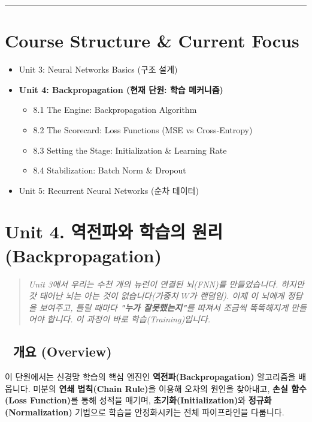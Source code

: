 \documentclass[11pt,a4paper]{book}
\theoremstyle{definition}
\begin{document}

\vspace{1cm}
\hrule
\vspace{1cm}

\section*{Course Structure \& Current Focus}
\begin{itemize}
    \item Unit 3: Neural Networks Basics (구조 설계)
    \item \textbf{\textcolor{mainblue}{Unit 4: Backpropagation (현재 단원: 학습 메커니즘)}}
    \begin{itemize}
        \item 8.1 The Engine: Backpropagation Algorithm
        \item 8.2 The Scorecard: Loss Functions (MSE vs Cross-Entropy)
        \item 8.3 Setting the Stage: Initialization \& Learning Rate
        \item 8.4 Stabilization: Batch Norm \& Dropout
    \end{itemize}
    \item Unit 5: Recurrent Neural Networks (순차 데이터)
\end{itemize}


\section{Unit 4. 역전파와 학습의 원리 (Backpropagation)}

\begin{quote}
\textit{Unit 3에서 우리는 수천 개의 뉴런이 연결된 뇌(FNN)를 만들었습니다. 하지만 갓 태어난 뇌는 아는 것이 없습니다(가중치 $W$가 랜덤임). 이제 이 뇌에게 정답을 보여주고, 틀릴 때마다 \textbf{"누가 잘못했는지"}를 따져서 조금씩 똑똑해지게 만들어야 합니다. 이 과정이 바로 학습(Training)입니다.}
\end{quote}

\subsection*{📌 개요 (Overview)}
이 단원에서는 신경망 학습의 핵심 엔진인 \textbf{역전파(Backpropagation)} 알고리즘을 배웁니다. 미분의 \textbf{연쇄 법칙(Chain Rule)}을 이용해 오차의 원인을 찾아내고, \textbf{손실 함수(Loss Function)}를 통해 성적을 매기며, \textbf{초기화(Initialization)}와 \textbf{정규화(Normalization)} 기법으로 학습을 안정화시키는 전체 파이프라인을 다룹니다.
\end{document}

